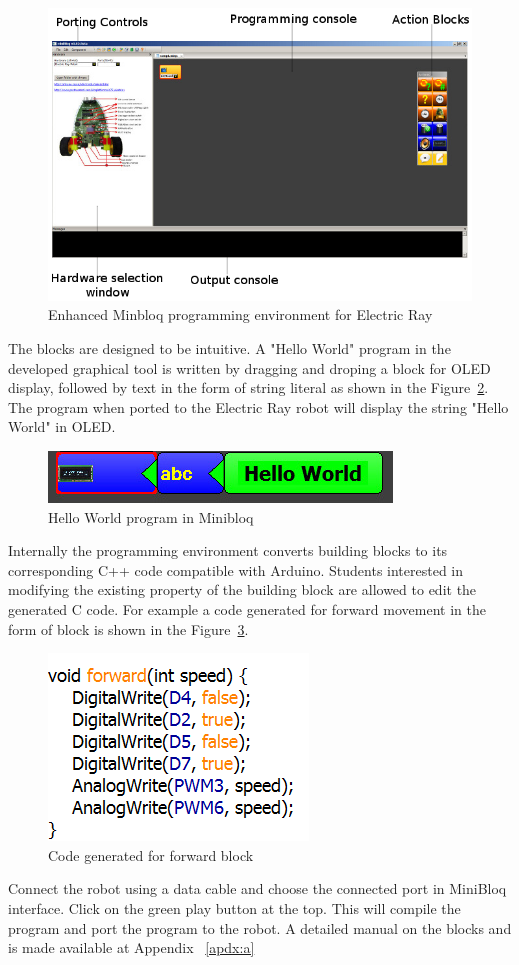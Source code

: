 \begin{figure}[h]
\centering
\includegraphics[width=1\columnwidth]{Images/minibloq}
\caption{Enhanced Minbloq programming environment for Electric Ray}
\label{fig:graphical}
\end{figure}

The blocks are designed to be intuitive. A "Hello World" program in the developed graphical tool is written by dragging and droping a block for OLED display, followed by text in the form of string literal as shown in the Figure~\ref{fig:helloworld}. The program when ported to the Electric Ray robot will display the string "Hello World" in OLED.

\begin{figure}[h]
\centering
\includegraphics[width=0.5\columnwidth]{Images/minibloq-helloworld}
\caption{Hello World program in Minibloq}
\label{fig:helloworld}
\end{figure}

Internally the programming environment converts building blocks to its corresponding C++ 
code compatible with Arduino. Students interested in modifying the existing property of the building block are allowed to edit the generated C code. For example a code generated for forward movement in the form of block is shown in the Figure~\ref{fig:code}.

\begin{figure}[h]
\centering
\includegraphics[width=0.35\columnwidth]{Images/minibloq-code}
\caption{Code generated for forward block}
\label{fig:code}
\end{figure}

Connect the robot using a data cable and choose the connected port in MiniBloq interface. Click on the green play button at the top. This will compile the program and port the program to the robot. A detailed manual on the blocks and is made available at Appendix ~\ref{apdx:a}

